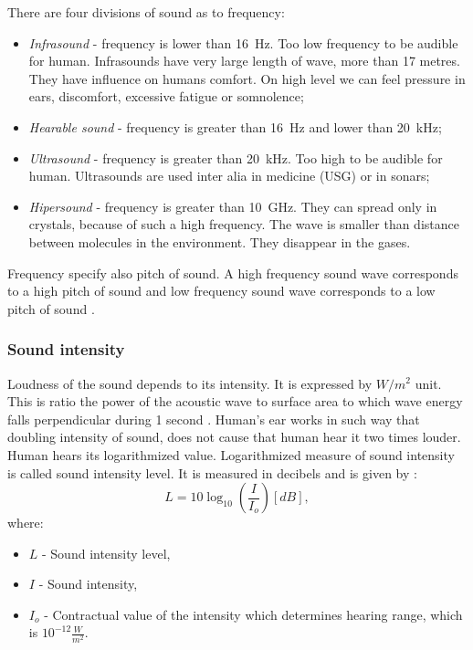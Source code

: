 \documentclass[11pt,titlepage]{article}
\theoremstyle{plain}
\begin{document}
There are four divisions of sound as to frequency:
\begin{itemize}
	\item \textit{Infrasound} - frequency is lower than 16~Hz. Too low frequency to be audible for human. Infrasounds have very large length of wave, more than 17 metres. They have influence on humans comfort. On high level we can feel pressure in ears, discomfort, excessive fatigue or somnolence;
	\item \textit{Hearable sound} - frequency is greater than 16~Hz and lower than 20~kHz;
	\item \textit{Ultrasound} - frequency is greater than 20~kHz. Too high to be audible for human. Ultrasounds are used inter alia in medicine (USG) or in sonars;
	\item \textit{Hipersound} - frequency is greater than 10~GHz. They can spread only in crystals, because of such a high frequency. The wave is smaller than distance between molecules in the environment. They disappear in the gases.
\end{itemize}

Frequency specify also pitch of sound. A high frequency sound wave corresponds to a high pitch of sound and low frequency sound wave corresponds to a low pitch of sound \cite{sound}.

\subsubsection{Sound intensity}
Loudness of the sound depends to its intensity. It is expressed by $W/m^2$ unit. This is ratio the power of the acoustic wave to surface area to which wave energy falls perpendicular during 1 second \cite{sound_intensity}. Human's ear works in such way that doubling intensity of sound, does not cause that human hear it two times louder. Human hears its logarithmized value. Logarithmized measure of sound intensity is called sound intensity level. It is measured in decibels and is given by \cite{decibels}:
\begin{equation}
	L = 10\log_{10}\left(\frac{I}{I_o}\right)  [dB],
\end{equation}
where:
\begin{itemize}
	\item $L$ - Sound intensity level,
	\item $I$ - Sound intensity,
	\item $I_o$ - Contractual value of the intensity which determines hearing range, which is $10^{-12}\frac{W}{m^2}.$
\end{itemize}
\end{document}
